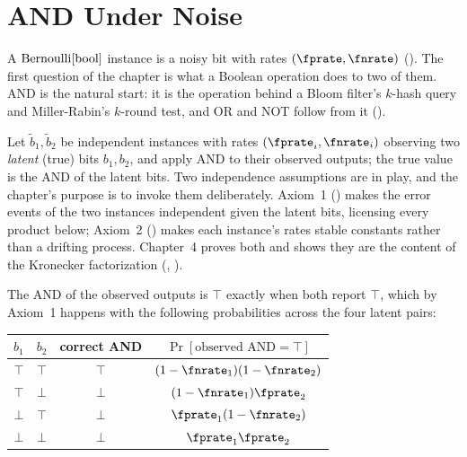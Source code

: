 %
%
%
%

\section{AND Under Noise}
\label{sec:and-under-noise}

A $\mathrm{Bernoulli}[\mathrm{bool}]$ instance is a noisy bit with rates $(\fprate,
\fnrate)$ (). The first question of the chapter is
what a Boolean operation does to two of them. AND is the natural start: it is
the operation behind a Bloom filter's $k$-hash query and Miller-Rabin's
$k$-round test, and OR and NOT follow from it ().

Let $\tilde{b}_1, \tilde{b}_2$ be independent instances with rates
$(\fprate_i, \fnrate_i)$ observing two \emph{latent} (true) bits $b_1, b_2$,
and apply AND to their observed outputs; the true value is the AND of the
latent bits. Two independence assumptions are in play, and the chapter's
purpose is to invoke them deliberately. Axiom~1
() makes the
error events of the two instances independent given the latent bits, licensing every product below; Axiom~2
() makes each instance's rates stable constants
rather than a drifting process. Chapter~4 proves both and shows they are the
content of the Kronecker factorization (,
).

The AND of the observed outputs is $\top$ exactly when both report $\top$,
which by Axiom~1 happens with the following probabilities across the four
latent pairs:

\begin{center}
\begin{tabular}{cccc}
\hline
$b_1$ & $b_2$ & correct AND & $\Pr[\text{observed AND} = \top]$ \\
\hline
$\top$ & $\top$ & $\top$ & $(1 - \fnrate_1)(1 - \fnrate_2)$ \\
$\top$ & $\bot$ & $\bot$ & $(1 - \fnrate_1)\fprate_2$ \\
$\bot$ & $\top$ & $\bot$ & $\fprate_1(1 - \fnrate_2)$ \\
$\bot$ & $\bot$ & $\bot$ & $\fprate_1 \fprate_2$ \\
\hline
\end{tabular}
\end{center}

